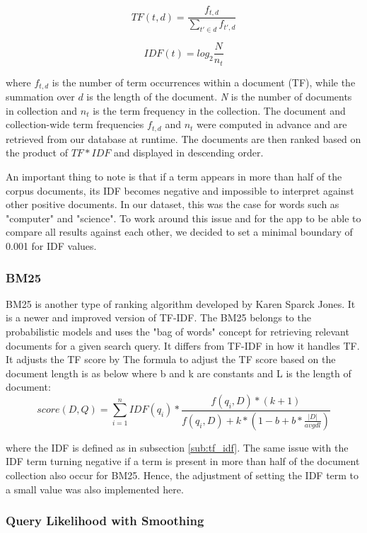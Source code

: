 $$TF(t,d) = \frac{f_{t,d}}{\sum\limits_{t' \in d} f_{t',d}}$$

$$IDF(t) = log_2 \frac{N}{n_t}$$

where $f_{t,d}$ is the number of term occurrences within a document (TF), while the summation over $d$ is the length of the document. \emph{N} is the number of documents in collection and $n_t$ is the term frequency in the collection. The document and collection-wide term frequencies $f_{t,d}$ and $n_t$ were computed in advance and are retrieved from our database at runtime. The documents are then ranked based on the product of $TF * IDF$ and displayed in descending order.

An important thing to note is that if a term appears in more than half of the corpus documents, its IDF becomes negative and impossible to interpret against other positive documents. In our dataset, this was the case for words such as "computer" and "science". To work around this issue and for the app to be able to compare all results against each other, we decided to set a minimal boundary of 0.001 for IDF values.


\subsubsection{BM25} %
\label{ssub:BM25}

BM25 is another type of ranking algorithm developed by Karen Sparck Jones. It is a newer and improved version of TF-IDF. The BM25 belongs to the probabilistic models and uses the "bag of words" concept for retrieving relevant documents for a given search query. It differs from TF-IDF in how it handles TF. It adjusts the TF score by %
The formula to adjust the TF score based on the document length is as below where b and k are constants and L is the length of document:
$$ score(D, Q) = \sum_{i=1}^n IDF(q_i) * \frac{f(q_i, D)* (k + 1)}{f(q_i, D) + k * (1-b + b * \frac{|D|}{avgdl})}$$

where the IDF is defined as in subsection \ref{sub:tf_idf}. The same issue with the IDF term turning negative if a term is present in more than half of the document collection also occur for BM25. Hence, the adjustment of setting the IDF term to a small value was also implemented here.


\subsubsection{Query Likelihood with Smoothing} %
\label{ssub:query_likelihood_with_smoothing}

